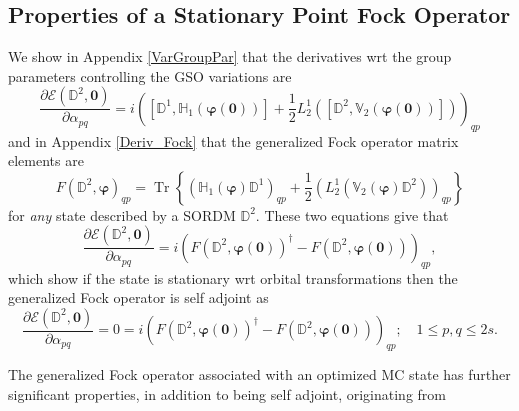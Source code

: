 \documentclass[aps,preprint]{revtex4}%
\begin{document}
\subsection{Properties of a Stationary Point Fock Operator\label{Stat_Fock}}

We show in Appendix \ref{VarGroupPar} that the derivatives wrt the group
parameters controlling the GSO variations are
\begin{equation}
\frac{\partial\mathcal{E}\left(  \mathbb{D}^{2},\bm{0}\right)  }%
{\partial\alpha_{pq}}=i\left(  \left[  \mathbb{D}^{1},\mathbb{H}_{1}\left(
\bm{\varphi}\left(  \bm{0}\right)  \right)  \right]  +\frac{1}{2}L_{2}%
^{1}\left(  \left[  \mathbb{D}^{2},\mathbb{V}_{2}\left(  \bm{\varphi }\left(
\bm{0}\right)  \right)  \right]  \right)  \right)  _{qp}%
\end{equation}
and in Appendix \ref{Deriv_Fock} that the generalized Fock operator matrix
elements are
\begin{equation}
F\left(  \mathbb{D}^{2},\bm{\varphi}\right)  _{qp}=\operatorname{Tr}\left\{
\left(  \mathbb{H}_{1}\left(  \bm{\varphi}\right)  \mathbb{D}^{1}\right)
_{qp}+\frac{1}{2}\left(  L_{2}^{1}\left(  \mathbb{V}_{2}\left(
\bm{\varphi}\right)  \mathbb{D}^{2}\right)  \right)  _{qp}\right\}
\end{equation}
for \emph{any} state described by a SORDM $\mathbb{D}^{2}$. These two
equations give that
\begin{equation}
\frac{\partial\mathcal{E}\left(  \mathbb{D}^{2},\bm{0}\right)  }%
{\partial\alpha_{pq}}=i\left(  F\left(  \mathbb{D}^{2},\bm{\varphi}\left(
\bm{0}\right)  \right)  ^{\dagger}-F\left(  \mathbb{D}^{2}%
,\bm{\varphi }\left(  \bm{0}\right)  \right)  \right)  _{qp},
\end{equation}
which show if the state is stationary wrt orbital transformations then the
generalized Fock operator is self adjoint as
\begin{equation}
\frac{\partial\mathcal{E}\left(  \mathbb{D}^{2},\bm{0}\right)  }%
{\partial\alpha_{pq}}=0=i\left(  F\left(  \mathbb{D}^{2},\bm{\varphi }\left(
\bm{0}\right)  \right)  ^{\dagger}-F\left(  \mathbb{D}^{2},\bm{\varphi}\left(
\bm{0}\right)  \right)  \right)  _{qp};\quad1\leq p,q\leq2s.
\end{equation}


The generalized Fock operator associated with an optimized MC state has
further significant properties, in addition to being self adjoint, originating from
\end{document}
